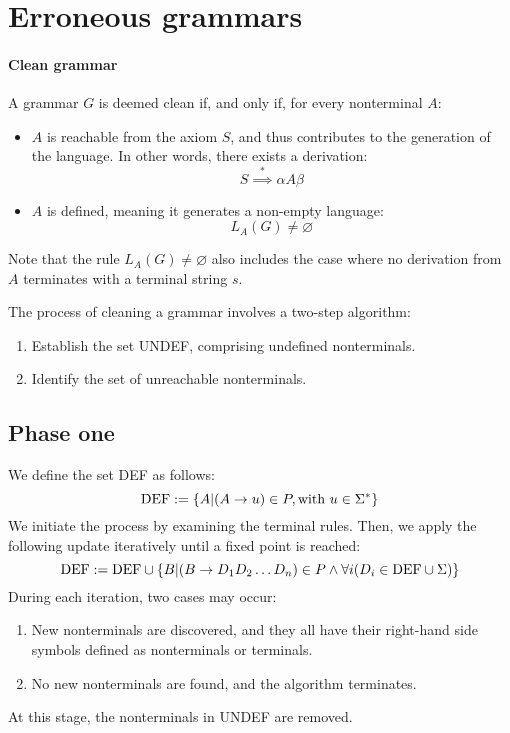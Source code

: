 \section{Erroneous grammars}

\paragraph*{Clean grammar}
A grammar $G$ is deemed clean  if, and only if, for every nonterminal $A$:
\begin{itemize}
    \item $A$ is reachable from the axiom $S$, and thus contributes to the generation of the language. 
        In other words, there exists a derivation:
        \[S \overset{*}{\implies} \alpha A \beta\]
    \item  $A$ is defined, meaning it generates a non-empty language:
        \[L_A(G) \neq \varnothing\]
\end{itemize}
Note that the rule $L_A(G) \neq \varnothing$ also includes the case where no derivation from $A$ terminates with a terminal string $s$.

The process of cleaning a grammar involves a two-step algorithm:
\begin{enumerate}
    \item Establish the set UNDEF, comprising undefined nonterminals.
    \item Identify the set of unreachable nonterminals.
\end{enumerate}

\subsection{Phase one}
We define the set DEF as follows:
\[\textnormal{DEF}:=\{A|( A \rightarrow u ) \in P,\textnormal{with } u \in \Sigma^{*}\}\]
We initiate the process by examining the terminal rules. 
Then, we apply the following update iteratively until a fixed point is reached:
\[\textnormal{DEF}:=\textnormal{DEF} \cup \{B|( B \rightarrow D_1D_2\dots D_n)\in P \land \forall i(D_i \in\textnormal{DEF} \cup \Sigma)\}\]
During each iteration, two cases may occur:
\begin{enumerate}
    \item New nonterminals are discovered, and they all have their right-hand side symbols defined as nonterminals or terminals.
    \item No new nonterminals are found, and the algorithm terminates.
\end{enumerate}
At this stage, the nonterminals in UNDEF are removed.

